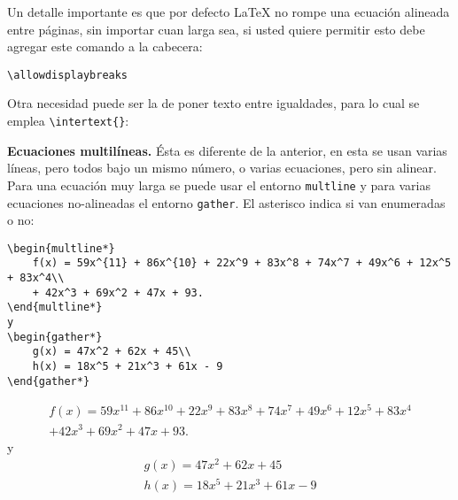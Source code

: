 \documentclass[intro-breve-latex.tex]{subfiles}
\begin{document}
Un detalle importante es que por defecto \LaTeX{} no rompe una ecuación alineada entre páginas, sin importar cuan larga
sea, si usted quiere permitir esto debe agregar este comando a la cabecera:
\begin{lstlisting}
\allowdisplaybreaks
\end{lstlisting}
Otra necesidad puede ser la de poner texto entre igualdades, para lo cual se emplea \lstinline|\intertext{}|:

\textbf{Ecuaciones multilíneas.}
Ésta es diferente de la anterior, en esta se usan varias líneas, pero todos bajo un mismo número, o varias ecuaciones,
pero sin alinear. Para una ecuación muy larga se puede usar el entorno \texttt{multline} y para varias ecuaciones
no-alineadas el entorno \texttt{gather}. El asterisco indica si van enumeradas o no:
\begin{lstlisting}
\begin{multline*}
	f(x) = 59x^{11} + 86x^{10} + 22x^9 + 83x^8 + 74x^7 + 49x^6 + 12x^5 + 83x^4\\
	+ 42x^3 + 69x^2 + 47x + 93.
\end{multline*}
y
\begin{gather*}
	g(x) = 47x^2 + 62x + 45\\
	h(x) = 18x^5 + 21x^3 + 61x - 9
\end{gather*}
\end{lstlisting}
\begin{multline*}
	f(x) = 59x^{11} + 86x^{10} + 22x^9 + 83x^8 + 74x^7 + 49x^6 + 12x^5 + 83x^4\\
	+ 42x^3 + 69x^2 + 47x + 93.
\end{multline*}
y
\begin{gather*}
	g(x) = 47x^2 + 62x + 45\\
	h(x) = 18x^5 + 21x^3 + 61x - 9
\end{gather*}
\end{document}
